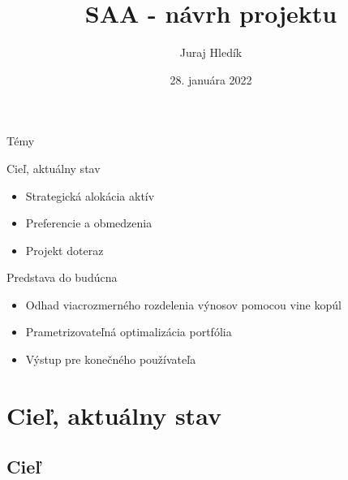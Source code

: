 \documentclass{Bredelebeamer}
\title{SAA - návrh projektu}
\subtitle{}
\author{Juraj Hledík}
\institute[]{NBS}
\date{28. januára 2022}
\begin{document}
\begin{frame}
\titlepage
\end{frame}


\begin{frame}{Témy}
\begin{block}{Cieľ, aktuálny stav}
	\begin{itemize}
	\item Strategická alokácia aktív
	\item Preferencie a obmedzenia
	\item Projekt doteraz	
	\end{itemize}
\end{block}


\pause\begin{block}{Predstava do budúcna}
	\begin{itemize}
		\item Odhad viacrozmerného rozdelenia výnosov pomocou vine kopúl
		\item Prametrizovateľná optimalizácia portfólia
		\item Výstup pre konečného používateľa
	\end{itemize}
\end{block}
\end{frame}

\section{Cieľ, aktuálny stav}
\subsection{Cieľ}
\end{document}
